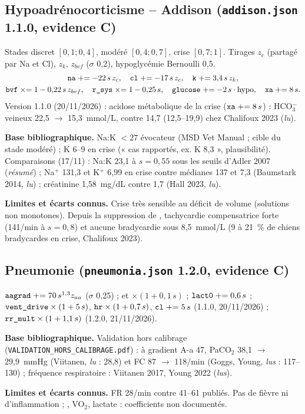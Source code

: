 \documentclass[10pt,a4paper]{article}
\newcommand{\cmd}[1]{\texttt{#1}}
\newcommand{\vp}[1]{\text{\texttt{\detokenize{#1}}}}
\newcommand{\acc}[1]{\textsl{#1}}
\newcommand{\limite}[1]{\par\textbf{Limites et écarts connus.} #1}
\newcommand{\sources}[1]{\par\textbf{Base bibliographique.} #1}
\begin{document}
\subsection{Hypoadrénocorticisme -- Addison (\cmd{addison.json} 1.1.0, evidence C)}
Stades discret $[0{,}1; 0{,}4]$, modéré $[0{,}4; 0{,}7]$, crise $[0{,}7; 1]$. Tirages $z_c$ (partagé par Na et Cl), $z_k$, $z_{bvf}$ ($\sigma$ 0,2), hypoglycémie Bernoulli 0,5.
\begin{gather}
\vp{na} \mathrel{+}= -22\,s\,z_c,\quad \vp{cl} \mathrel{+}= -17\,s\,z_c,\quad \vp{k} \mathrel{+}= 3{,}4\,s\,z_k,\\
\vp{bvf} \mathrel{\times}= 1 - 0{,}22\,s\,z_{bvf},\quad \vp{r_sys} \mathrel{\times}= 1 - 0{,}25\,s,\quad \vp{glucose} \mathrel{+}= -2\,s\cdot\text{hypo},\quad \vp{xa} \mathrel{+}= 8\,s.
\end{gather}
Version 1.1.0 (20/11/2026) : acidose métabolique de la crise ($\vp{xa} \mathrel{+}= 8\,s$) : HCO$_3^-$ veineux 22,5 $\to$ 15,3~mmol/L, contre 14,7 (12,5--19,9) chez Chalifoux 2023 (\acc{lu}).
\sources{Na:K $< 27$ évocateur (MSD Vet Manual ; cible du stade modéré) ; K 6--9 en crise (« cas rapportés, ex. K 8,3 », plausibilité). Comparaisons (17/11) : Na:K 23,1 à $s = 0{,}55$ sous les seuils d'Adler 2007 (\acc{résumé}) ; Na$^+$ 131,3 et K$^+$ 6,99 en crise contre médianes 137 et 7,3 (Baumstark 2014, \acc{lu}) ; créatinine 1,58~mg/dL contre 1,7 (Hall 2023, \acc{lu}).}
\limite{Crise très sensible au déficit de volume (solutions non monotones). Depuis la suppression de \vp{kfac}, tachycardie compensatrice forte (141/min à $s = 0{,}8$) et aucune bradycardie sous 8,5~mmol/L (9 à 21~\% de chiens bradycardes en crise, Chalifoux 2023).}

\subsection{Pneumonie (\cmd{pneumonia.json} 1.2.0, evidence C)}
$\vp{aagrad} \mathrel{+}= 70\,s^{1{,}3} z_{aa}$ ($\sigma$ 0,25) ; \vp{vco2} et \vp{vo2} $\times (1 + 0{,}1\,s)$ ; $\vp{lact0} \mathrel{+}= 0{,}6\,s$ ; $\vp{vent_drive} \times (1 + 5\,s)$, $\vp{hr} \times (1 + 0{,}7\,s)$, $\vp{cl} \mathrel{+}= 5\,s$ (1.1.0, 20/11/2026) ; $\vp{rr_mult} \times (1 + 1{,}1\,s)$ (1.2.0, 21/11/2026).
\sources{Validation hors calibrage (\cmd{VALIDATION\_HORS\_CALIBRAGE.pdf}) : à gradient A-a 47, PaCO$_2$ 38,1 $\to$ 29,9~mmHg (Viitanen, \acc{lu} : 28,8) et FC 87 $\to$ 118/min (Goggs, Young, \acc{lus} : 117--130) ; fréquence respiratoire : Viitanen 2017, Young 2022 (\acc{lus}).}
\limite{FR 28/min contre 41--61 publiés. Pas de fièvre ni d'inflammation ; \vp{aagrad}, VO$_2$, lactate : coefficients non documentés.}
\end{document}
